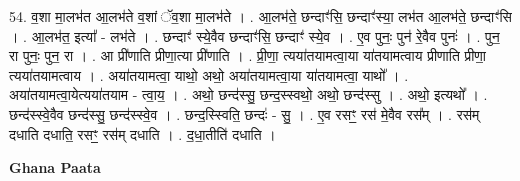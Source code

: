 \documentclass[17pt]{extarticle}
\begin{document}
54. व॒शा मा॒लभ॑त आ॒लभ॑ते व॒शां ॅव॒शा मा॒लभ॑ते । . आ॒लभ॑ते॒ छन्दाꣳ॑सि॒ छन्दाꣳ॑स्या॒ लभ॑त आ॒लभ॑ते॒ छन्दाꣳ॑सि । . आ॒लभ॑त॒ इत्या᳚ - लभ॑ते । . छन्दाꣳ॑ स्ये॒वैव छन्दाꣳ॑सि॒ छन्दाꣳ॑ स्ये॒व । . ए॒व पुनः॒ पुन॑ रे॒वैव पुनः॑ । . पुन॒ रा पुनः॒ पुन॒ रा । . आ प्री॑णाति प्रीणा॒त्या प्री॑णाति । . प्री॒णा॒ त्यया॑तयामत्वा॒या या॑तयामत्वाय प्रीणाति प्रीणा॒ त्यया॑तयामत्वाय । . अया॑तयामत्वा॒ याथो॒ अथो॒ अया॑तयामत्वा॒या या॑तयामत्वा॒ याथो᳚ । . अया॑तयामत्वा॒येत्यया॑तयाम - त्वा॒य॒ । . अथो॒ छन्द॑स्सु॒ छन्द॒स्स्वथो॒ अथो॒ छन्द॑स्सु । . अथो॒ इत्यथो᳚ । . छन्द॑स्स्वे॒वैव छन्द॑स्सु॒ छन्द॑स्स्वे॒व । . छन्द॒स्स्विति॒ छन्दः॑ - सु॒ । . ए॒व रसꣳ॒॒ रस॑ मे॒वैव रस᳚म् । . रस॑म् दधाति दधाति॒ रसꣳ॒॒ रस॑म् दधाति । . द॒धा॒तीति॑ दधाति । \newline

\textbf{Ghana Paata } \newline
\end{document}
